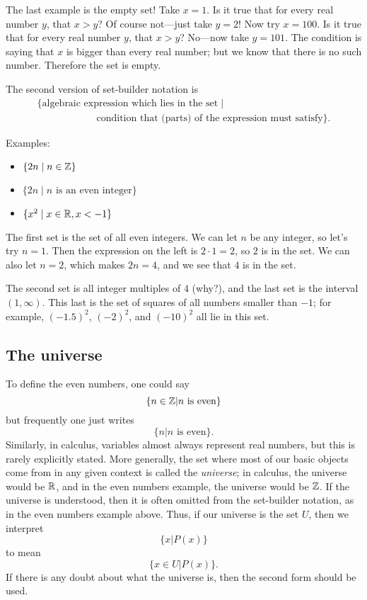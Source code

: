 \documentclass{tufte-book}
\begin{document}
The last example is the empty set! Take $x = 1$. Is it true that for every real number $y$, that $x > y$? Of course not---just take $y = 2$! Now try $x = 100$. Is it true that for every real number $y$, that $x > y$? No---now take $y = 101$. The condition is saying that $x$ is bigger than every real number; but we know that there is no such number. Therefore the set is empty.

The second version of set-builder notation is
\begin{gather*}
  \{ \text{algebraic expression which lies in the set} \mid \\
  \qquad \qquad \qquad \text{condition that (parts) of the expression must satisfy}\}.
\end{gather*}

Examples:
\begin{itemize}
    \item $\{2n \mid n \in \mathbb{Z}\}$
    \item $\{2n \mid n \text{ is an even integer}\}$
    \item $\{x^2 \mid x \in \mathbb{R}, x < -1\}$
\end{itemize}
The first set is the set of all even integers. We can let $n$ be any integer, so let's try $n = 1$. Then the expression on the left is $2 \cdot 1 = 2$, so $2$ is in the set. We can also let $n = 2$, which makes $2n = 4$, and we see that $4$ is in the set. 

The second set is all integer multiples of $4$ (why?), and the last set is the interval $(1, \infty)$. This last is the set of squares of all numbers smaller than $-1$; for example, $(-1.5)^2$, $(-2)^2$, and $(-10)^2$ all lie in this set.

\subsection{The universe}
\label{sec:universe}

To define the even numbers, one could say
\[
\{n \in \mathbb{Z} | n \text{ is even}\}
\]
but frequently one just writes
\[
\{n | n \text{ is even}\}.
\]
Similarly, in calculus, variables almost always represent real numbers, but this is rarely explicitly stated. More generally, the set where most of our basic objects come from in any given context is called the \emph{universe}; in calculus, the universe would be $\mathbb{R}$, and in the even numbers example, the universe would be $\mathbb{Z}$. If the universe is understood, then it is often omitted from the set-builder notation, as in the even numbers example above. Thus, if our universe is the set $U$, then we interpret
\[
\{x | P(x)\} 
\]
to mean
\[
\{x \in U | P(x)\}.
\]
If there is any doubt about what the universe is, then the second form should be used.
\end{document}
